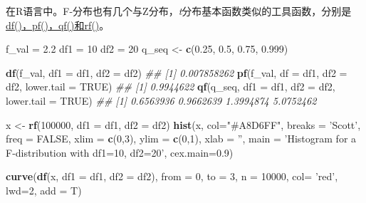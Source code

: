 \documentclass[
]{article}
\newenvironment{Shaded}{\begin{snugshade}}{\end{snugshade}}
\newcommand{\CommentTok}[1]{\textcolor[rgb]{0.56,0.35,0.01}{\textit{#1}}}
\newcommand{\DataTypeTok}[1]{\textcolor[rgb]{0.13,0.29,0.53}{#1}}
\newcommand{\DecValTok}[1]{\textcolor[rgb]{0.00,0.00,0.81}{#1}}
\newcommand{\FloatTok}[1]{\textcolor[rgb]{0.00,0.00,0.81}{#1}}
\newcommand{\KeywordTok}[1]{\textcolor[rgb]{0.13,0.29,0.53}{\textbf{#1}}}
\newcommand{\NormalTok}[1]{#1}
\newcommand{\OtherTok}[1]{\textcolor[rgb]{0.56,0.35,0.01}{#1}}
\newcommand{\StringTok}[1]{\textcolor[rgb]{0.31,0.60,0.02}{#1}}
\begin{document}
在R语言中。F-分布也有几个与Z分布，\emph{t}分布基本函数类似的工具函数，分别是\href{https://stat.ethz.ch/R-manual/R-devel/library/stats/html/Fdist.html}{df()，pf()，qf()和rf()}。

\begin{Shaded}
\begin{Highlighting}[]
\NormalTok{f_val =}\StringTok{ }\FloatTok{2.2}
\NormalTok{df1 =}\StringTok{ }\DecValTok{10}
\NormalTok{df2 =}\StringTok{ }\DecValTok{20}
\NormalTok{q_seq <-}\StringTok{ }\KeywordTok{c}\NormalTok{(}\FloatTok{0.25}\NormalTok{, }\FloatTok{0.5}\NormalTok{, }\FloatTok{0.75}\NormalTok{, }\FloatTok{0.999}\NormalTok{)}

\KeywordTok{df}\NormalTok{(f_val, }\DataTypeTok{df1 =}\NormalTok{ df1, }\DataTypeTok{df2 =}\NormalTok{ df2)}
\CommentTok{## [1] 0.007858262}
\KeywordTok{pf}\NormalTok{(f_val, }\DataTypeTok{df =}\NormalTok{ df1, }\DataTypeTok{df2 =}\NormalTok{ df2, }\DataTypeTok{lower.tail =} \OtherTok{TRUE}\NormalTok{)}
\CommentTok{## [1] 0.9944622}
\KeywordTok{qf}\NormalTok{(q_seq, }\DataTypeTok{df1 =}\NormalTok{ df1, }\DataTypeTok{df2 =}\NormalTok{ df2, }\DataTypeTok{lower.tail =} \OtherTok{TRUE}\NormalTok{)}
\CommentTok{## [1] 0.6563936 0.9662639 1.3994874 5.0752462}

\NormalTok{x <-}\StringTok{ }\KeywordTok{rf}\NormalTok{(}\DecValTok{100000}\NormalTok{, }\DataTypeTok{df1 =}\NormalTok{ df1, }\DataTypeTok{df2 =}\NormalTok{ df2)}
\KeywordTok{hist}\NormalTok{(x, }\DataTypeTok{col=}\StringTok{"#A8D6FF"}\NormalTok{,}
     \DataTypeTok{breaks =} \StringTok{'Scott'}\NormalTok{, }\DataTypeTok{freq =} \OtherTok{FALSE}\NormalTok{, }
     \DataTypeTok{xlim =} \KeywordTok{c}\NormalTok{(}\DecValTok{0}\NormalTok{,}\DecValTok{3}\NormalTok{), }\DataTypeTok{ylim =} \KeywordTok{c}\NormalTok{(}\DecValTok{0}\NormalTok{,}\DecValTok{1}\NormalTok{),}
     \DataTypeTok{xlab =} \StringTok{''}\NormalTok{, }\DataTypeTok{main =} \StringTok{'Histogram for a F-distribution with df1=10, df2=20'}\NormalTok{, }\DataTypeTok{cex.main=}\FloatTok{0.9}\NormalTok{)}

\KeywordTok{curve}\NormalTok{(}\KeywordTok{df}\NormalTok{(x, }\DataTypeTok{df1 =}\NormalTok{ df1, }\DataTypeTok{df2 =}\NormalTok{ df2), }\DataTypeTok{from =} \DecValTok{0}\NormalTok{, }\DataTypeTok{to =} \DecValTok{3}\NormalTok{, }\DataTypeTok{n =} \DecValTok{10000}\NormalTok{, }\DataTypeTok{col=} \StringTok{'red'}\NormalTok{, }\DataTypeTok{lwd=}\DecValTok{2}\NormalTok{, }\DataTypeTok{add =}\NormalTok{ T)}
\end{Highlighting}
\end{Shaded}
\end{document}
